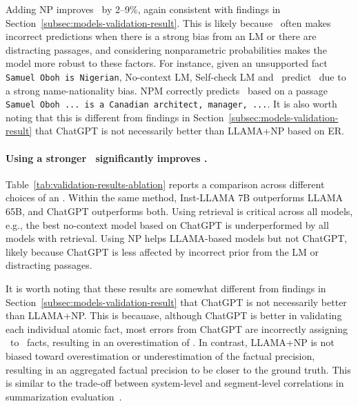 Adding NP improves \rtg\ by 2--9\%, again consistent with findings in Section~\ref{subsec:models-validation-result}. This is likely because \rtg\ often makes incorrect predictions when there is a strong bias from an LM or there are distracting passages, and considering nonparametric probabilities makes the model more robust to these factors. For instance, given an unsupported fact \texttt{Samuel Oboh is Nigerian}, No-context LM, Self-check LM and \rtg\ predict \sLabel\ due to a strong name-nationality bias.
NPM correctly predicts \nsLabel\ based on a passage \texttt{Samuel Oboh ... is a Canadian architect, manager, ...}.
It is also worth noting that this is different from findings in Section~\ref{subsec:models-validation-result} that ChatGPT is not necessarily better than LLAMA+NP  based on ER.


\paragraph{Using a stronger \evalLM\ significantly improves \Fone.}
Table~\ref{tab:validation-results-ablation} reports a comparison across different choices of an \evalLM{}. Within the same method, Inst-LLAMA 7B outperforms LLAMA 65B, and ChatGPT outperforms both.
Using retrieval is critical across all models, e.g., the best no-context model based on ChatGPT is underperformed by all models with retrieval.
Using NP helps LLAMA-based models but not ChatGPT, likely because ChatGPT is less affected by incorrect prior from the LM or distracting passages.

It is worth noting that these results are somewhat different from findings in Section~\ref{subsec:models-validation-result} that ChatGPT is not necessarily better than LLAMA+NP. This is becauase, although ChatGPT is better in validating each individual atomic fact, most errors from ChatGPT are incorrectly assigning \sLabel\ to \nsLabel\ facts, resulting in an overestimation of \ours.
In contrast, LLAMA+NP is not biased toward overestimation or underestimation of the factual precision, resulting in an aggregated factual precision to be closer to the ground truth.
This is similar to the trade-off between system-level and segment-level correlations in summarization evaluation~\citep{bhandari-etal-2020-evaluating,deutsch2021towards}.


